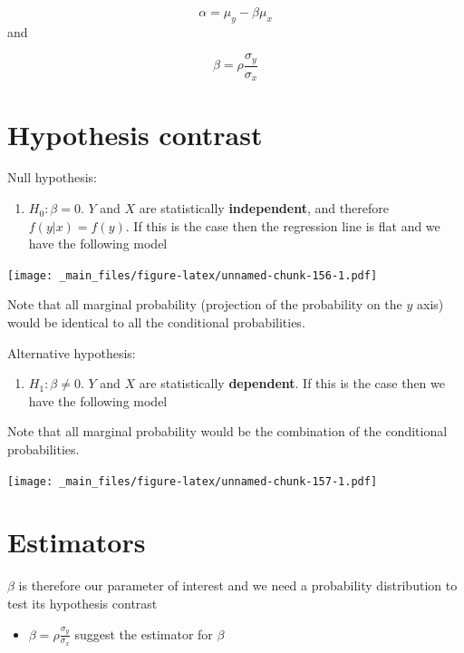 \documentclass[
]{book}
\providecommand{\tightlist}{%
  \setlength{\itemsep}{0pt}\setlength{\parskip}{0pt}}
\begin{document}
\[\alpha=\mu_y-\beta\mu_x\]
and

\[\beta=\rho\frac{\sigma_y}{\sigma_x}\]

\hypertarget{hypothesis-contrast-1}{%
\section{Hypothesis contrast}\label{hypothesis-contrast-1}}

Null hypothesis:

\begin{enumerate}
\def\labelenumi{\alph{enumi}.}
\tightlist
\item
  \(H_0: \beta=0\). \(Y\) and \(X\) are statistically \textbf{independent}, and therefore \(f(y|x)=f(y)\). If this is the case then the regression line is flat and we have the following model
\end{enumerate}

\texttt{[image: \_main\_files/figure-latex/unnamed-chunk-156-1.pdf]}

Note that all marginal probability (projection of the probability on the \(y\) axis) would be identical to all the conditional probabilities.

Alternative hypothesis:

\begin{enumerate}
\def\labelenumi{\alph{enumi}.}
\setcounter{enumi}{1}
\tightlist
\item
  \(H_1: \beta\neq 0\). \(Y\) and \(X\) are statistically \textbf{dependent}. If this is the case then we have the following model
\end{enumerate}

Note that all marginal probability would be the combination of the conditional probabilities.

\texttt{[image: \_main\_files/figure-latex/unnamed-chunk-157-1.pdf]}

\hypertarget{estimators-1}{%
\section{Estimators}\label{estimators-1}}

\(\beta\) is therefore our parameter of interest and we need a probability distribution to test its hypothesis contrast

\begin{itemize}
\tightlist
\item
  \(\beta=\rho\frac{\sigma_y}{\sigma_x}\) suggest the estimator for \(\beta\)
\end{itemize}
\end{document}
